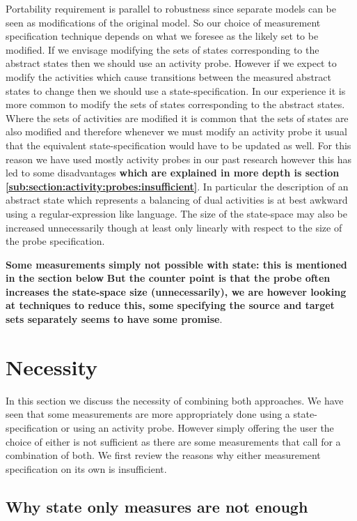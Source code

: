 \documentclass[times, 10pt,twocolumn]{article}
\newcommand{\adcComment}[1]{\textbf{#1}}
\begin{document}
Portability requirement is parallel to robustness since separate
models can be seen as modifications of the original model.
So our choice of measurement specification technique depends on what
we foresee as the likely set to be modified. If we envisage modifying
the sets of states corresponding to the abstract states then we should
use an activity probe. However if we expect to modify the activities
which cause transitions between the measured abstract states to change
then we should use a state-specification.
In our experience it is more common to modify the sets of states
corresponding to the abstract states. Where the sets of activities
are modified it is common that the sets of states are also modified
and therefore whenever we must modify an activity probe it usual that
the equivalent state-specification would have to be updated as well.
For this reason we have used mostly activity probes in our past research
however this has led to some disadvantages
\adcComment{which are explained in more depth is section
\ref{sub:section:activity:probes:insufficient}}.
In particular the description of an abstract state which represents
a balancing of dual activities is at best awkward using
a regular-expression like language. The size of the state-space may also
be increased unnecessarily though at least only linearly with respect
to the size of the probe specification.

\adcComment{Some measurements simply not possible with state:
this is mentioned in the section below}
\adcComment{But the counter point is that the probe often increases
the state-space size (unnecessarily), we are however looking at techniques
to reduce this, some specifying the source and target sets separately
seems to have some promise}.


\section{Necessity}

In this section we discuss the necessity of combining both approaches.
We have seen that some measurements are more appropriately done
using a state-specification or using an activity probe.
However simply offering the user the choice of either is not sufficient
as there are some measurements that call for a combination of both.
We first review the reasons why either measurement specification
on its own is insufficient.

\subsection{Why state only measures are not enough}
\end{document}
